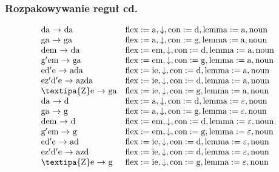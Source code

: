 \documentclass{beamer}
\begin{document}
\begin{frame}
\frametitle{Rozpakowywanie reguł cd.}
\begin{scriptsize}\[
\begin{array}{ll}
\text{da $\rightarrow$ da} & \text{flex}:=\text{a}, \downarrow, \text{con}:=\text{d}, \text{lemma}:=\text{a}, \text{noun}\\
\text{ga $\rightarrow$ ga} & \text{flex}:=\text{a}, \downarrow, \text{con}:=\text{g}, \text{lemma}:=\text{a}, \text{noun}\\
\text{dem $\rightarrow$ da} & \text{flex}:=\text{em}, \downarrow, \text{con}:=\text{d}, \text{lemma}:=\text{a}, \text{noun}\\
\text{g$'$em $\rightarrow$ ga} & \text{flex}:=\text{em}, \downarrow, \text{con}:=\text{g}, \text{lemma}:=\text{a}, \text{noun}\\
\text{ed$'$e $\rightarrow$ ada} & \text{flex}:=\text{ie}, \downarrow, \text{con}:=\text{d}, \text{lemma}:=\text{a}, \text{noun}\\
\text{ez$'$d$'$e $\rightarrow$ azda} & \text{flex}:=\text{ie}, \downarrow, \text{con}:=\text{d}, \text{lemma}:=\text{a}, \text{noun}\\
\text{\textipa{Z}e $\rightarrow$ ga} & \text{flex}:=\text{ie}, \downarrow, \text{con}:=\text{g}, \text{lemma}:=\text{a}, \text{noun}\\
\text{da $\rightarrow$ d} & \text{flex}:=\text{a}, \downarrow, \text{con}:=\text{d}, \text{lemma}:=\text{$\varepsilon$}, \text{noun}\\
\text{ga $\rightarrow$ g} & \text{flex}:=\text{a}, \downarrow, \text{con}:=\text{g}, \text{lemma}:=\text{$\varepsilon$}, \text{noun}\\
\text{dem $\rightarrow$ d} & \text{flex}:=\text{em}, \downarrow, \text{con}:=\text{d}, \text{lemma}:=\text{$\varepsilon$}, \text{noun}\\
\text{g$'$em $\rightarrow$ g} & \text{flex}:=\text{em}, \downarrow, \text{con}:=\text{g}, \text{lemma}:=\text{$\varepsilon$}, \text{noun}\\
\text{ed$'$e $\rightarrow$ ad} & \text{flex}:=\text{ie}, \downarrow, \text{con}:=\text{d}, \text{lemma}:=\text{$\varepsilon$}, \text{noun}\\
\text{ez$'$d$'$e $\rightarrow$ azd} & \text{flex}:=\text{ie}, \downarrow, \text{con}:=\text{d}, \text{lemma}:=\text{$\varepsilon$}, \text{noun}\\
\text{\textipa{Z}e $\rightarrow$ g} & \text{flex}:=\text{ie}, \downarrow, \text{con}:=\text{g}, \text{lemma}:=\text{$\varepsilon$}, \text{noun}\\

\end{array}\]
\end{scriptsize}
\end{frame}
\end{document}
